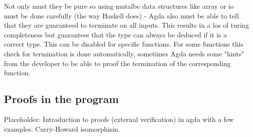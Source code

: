  Not only must they be pure  so using mutalbe data structures like array or io must be done carefully (the way Haskell does) - Agda also must be able to tell that they are guaranteed to terminate on all inputs. 
This results in a los of turing completeness but guarantees that the type can always be deduced if it is a correct type. 
This can be disabled for specific functions. For some functions this check for termination is done automatically, sometimes Agda needs some "hints" from the developer to be able to proof the termination of the corresponding function.
\subsection{Proofs in the program}
Placeholder: Introduction to proofs (external verification) in agda with a few examples.
Curry-Howard isomorphism.
\cite{norell:deptyped, 10.1145/2841316, plfa2019}

